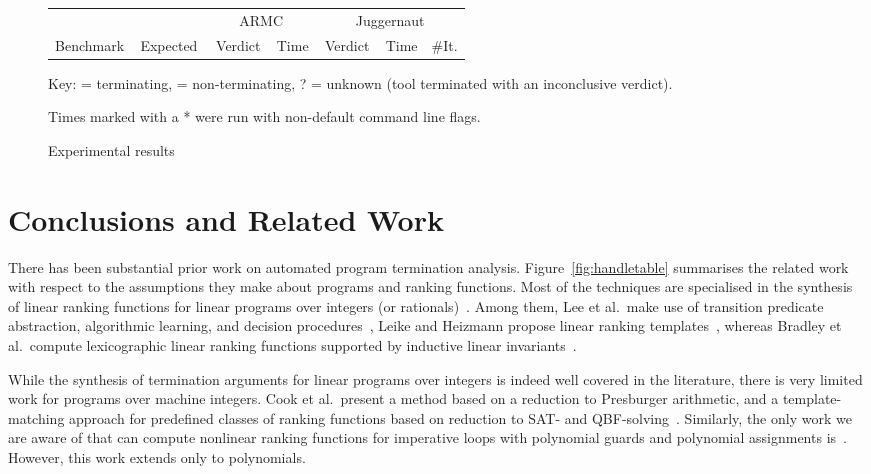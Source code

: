\documentclass[preprint]{sigplanconf}
\theoremstyle{definition}
\newcommand{\xmark}{\ding{55}}
\newcommand{\tick}{\checkmark}
\begin{document}
\begin{figure}
\centering
\scriptsize
\begin{tabular}{|l|@{}c@{}||@{}c@{}|r||@{}c@{}|r|r|}
\hline
          &             & \multicolumn{2}{|c||}{\sc ARMC} & \multicolumn{3}{|c|}{\sc Juggernaut} \\
Benchmark & \,Expected\, & \,Verdict\, & Time & \,Verdict\, & Time & \#It.\\
    \hline
    \hline

    \hline
\end{tabular}

Key: \tick = terminating, \xmark = non-terminating, ? = unknown (tool terminated with an inconclusive verdict).

Times marked with a * were run with non-default command line flags.

\caption{Experimental results\label{fig:experiments}}
 \end{figure}

\section{Conclusions and Related Work}

There has been substantial prior work on automated program termination
analysis.  Figure~\ref{fig:handletable} summarises the related work with
respect to the assumptions they make about programs and ranking functions. 
Most of the techniques are specialised in the synthesis of linear ranking
functions for linear programs over integers (or
rationals)~\cite{DBLP:conf/pldi/CookPR06, DBLP:conf/cav/LeeWY12,
DBLP:conf/popl/Ben-AmramG13, DBLP:conf/vmcai/P04,
DBLP:conf/atva/HeizmannHLP13, DBLP:conf/cav/BradleyMS05,
DBLP:conf/tacas/CookSZ13, DBLP:conf/cav/KroeningSTW10}.  Among them, Lee et
al.~make use of transition predicate abstraction, algorithmic learning, and
decision procedures~\cite{DBLP:conf/cav/LeeWY12}, Leike and Heizmann propose
linear ranking templates~\cite{DBLP:conf/tacas/LeikeH14}, whereas Bradley et
al.~compute lexicographic linear ranking functions supported by inductive
linear invariants~\cite{DBLP:conf/cav/BradleyMS05}.

While the synthesis of termination arguments for linear programs over
integers is indeed well covered in the literature, there is very limited
work for programs over machine integers.  Cook et al.~present a method
based on a reduction to Presburger arithmetic, and a template-matching
approach for predefined classes of ranking functions based on reduction to
SAT- and QBF-solving~\cite{DBLP:conf/tacas/CookKRW10}.  Similarly, the only
work we are aware of that can compute nonlinear ranking functions for
imperative loops with polynomial guards and polynomial assignments
is~\cite{DBLP:conf/vmcai/BradleyMS05}.  However, this work extends only to
polynomials.
\end{document}
